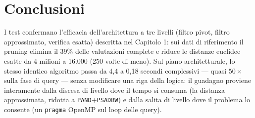 \section{Conclusioni}
I test confermano l'efficacia dell'architettura a tre livelli (filtro pivot, filtro approssimato, verifica esatta) descritta nel Capitolo 1: sui dati di riferimento il pruning elimina il 39\% delle valutazioni complete e riduce le distanze euclidee esatte da 4 milioni a 16.000 (250 volte di meno). Sul piano architetturale, lo stesso identico algoritmo passa da 4,4 a 0,18 secondi complessivi — quasi $50\times$ sulla fase di query — senza modificare una riga della logica: il guadagno proviene interamente dalla discesa di livello dove il tempo si consuma (la distanza approssimata, ridotta a \texttt{PAND}+\texttt{PSADBW}) e dalla salita di livello dove il problema lo consente (un \texttt{pragma} OpenMP sul loop delle query).
